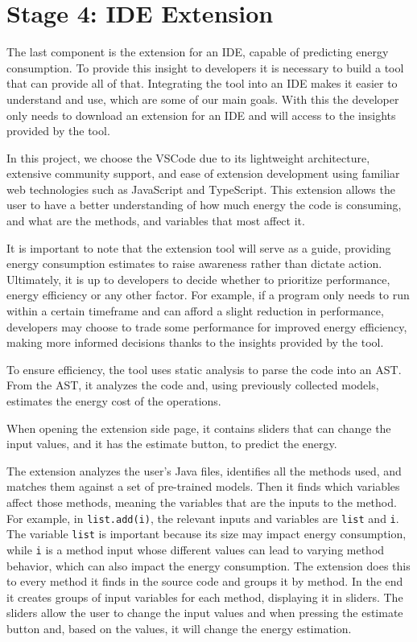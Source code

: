 \section{Stage 4: IDE Extension} \label{sec:work_stage4_extension_build}

{\color{blue}The last component is the extension for an IDE, capable of predicting energy consumption. 
To provide this insight to developers it is necessary to build a tool that can provide all of that. Integrating the tool into an IDE makes it easier to understand and use, which are some of our main goals. With this the developer only needs to download an extension for an IDE and will access to the insights provided by the tool.

In this project, we choose the VSCode due to its lightweight architecture, extensive community support, and ease of extension development using familiar web technologies such as JavaScript and TypeScript. This extension allows the user to have a better understanding of how much energy the code is consuming, and what are the methods, and variables that most affect it.

It is important to note that the extension tool will serve as a guide, providing energy consumption estimates to raise awareness rather than dictate action. Ultimately, it is up to developers to decide whether to prioritize performance, energy efficiency or any other factor. For example, if a program only needs to run within a certain timeframe and can afford a slight reduction in performance, developers may choose to trade some performance for improved energy efficiency, making more informed decisions thanks to the insights provided by the tool.

To ensure efficiency, the tool uses static analysis to parse the code into an AST. From the AST, it analyzes the code and, using previously collected models, estimates the energy cost of the operations.}


When opening the extension side page, it contains sliders that can change the input values, and it has the estimate button, to predict the energy.

The extension analyzes the user's Java files, identifies all the methods used, and matches them against a set of pre-trained models. Then it finds which variables affect those methods, meaning the variables that are the inputs to the method. For example, in \texttt{list.add(i)}, the relevant inputs and variables are \texttt{list} and \texttt{i}. The variable \texttt{list} is important because its size may impact energy consumption, while \texttt{i} is a method input whose different values can lead to varying method behavior, which can also impact the energy consumption.
The extension does this to every method it finds in the source code and groups it by method. In the end it creates groups of input variables for each method, displaying it in sliders. The sliders allow the user to change the input values and when pressing the estimate button and, based on the values, it will change the energy estimation.

